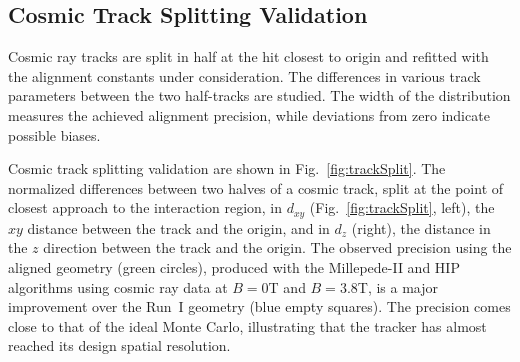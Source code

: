 \subsection{Cosmic Track Splitting Validation}
\label{sec:AlRes_trackSplit}

Cosmic ray tracks are split in half at the hit closest to origin and refitted with the alignment constants under consideration. The differences in various track parameters between the two half-tracks are studied. The width of the distribution measures the achieved alignment precision, while deviations from zero indicate possible biases. 

Cosmic track splitting validation are shown in Fig.~\ref{fig:trackSplit}. The normalized differences between two halves of a cosmic track, split at the point of closest approach to the interaction region, in $d_{xy}$ (Fig.~\ref{fig:trackSplit}, left), the $xy$ distance between the track and the origin, and in $d_z$ (right), the distance in the $z$ direction between the track and the origin. The observed precision using the aligned geometry (green circles), produced with the Millepede-II and HIP algorithms using cosmic ray data at $B=0$T and $B=3.8$T, is a major improvement over the Run~I geometry (blue empty squares). The precision comes close to that of the ideal Monte Carlo, illustrating that the tracker has almost reached its design spatial resolution.

